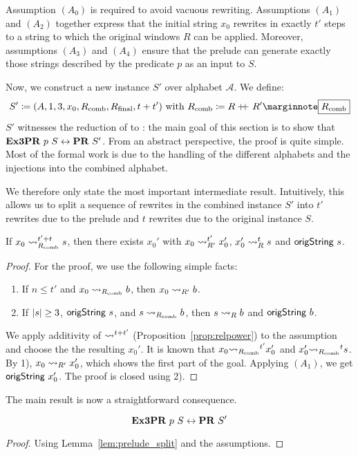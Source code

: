 Assumption $(A_0)$ is required to avoid vacuous rewriting.
Assumptions $(A_1)$ and $(A_2)$ together express that the initial string $x_0$ rewrites in exactly $t'$ steps to a string to which the original windows $R$ can be applied. Moreover, assumptions $(A_3)$ and $(A_4)$ ensure that the prelude can generate exactly those strings described by the predicate $p$ as an input to $S$.

\newcommand{\Rcomb}{\ensuremath{R_{\text{comb}}}}
Now, we construct a new \PR{} instance $S'$ over alphabet $\mathcal{A}$. We define:
\[S' \defeq (A, 1, 3, x_0, \Rcomb, \Rfinal, t + t')~\text{with}~\Rcomb \defeq R \concat R' \mnote{$\Rcomb$}\]
$S'$ witnesses the reduction of \expr{} to \PR{}: the main goal of this section is to show that 
$\textbf{Ex3PR}{}~p~S \leftrightarrow \textbf{PR}{}~S'$. From an abstract perspective, the proof is quite simple. 
Most of the formal work is due to the handling of the different alphabets and the injections into the combined alphabet.

We therefore only state the most important intermediate result. Intuitively, this allows us to split a sequence of rewrites in the combined instance $S'$ into $t'$ rewrites due to the prelude and $t$ rewrites due to the original instance $S$. 
\begin{lemma}\label{lem:prelude_split}
  If $x_0 \strent{\Rcomb}^{t' + t} s$, then there exists $x_0'$ with $x_0 \rightsquigarrow_{R'}^{t'} x_0'$, $x_0' \rightsquigarrow_{R}^t s$ and $\textsf{origString}~s$. 
\end{lemma}
\begin{proof}
  For the proof, we use the following simple facts:
  \begin{enumerate}[1)]
    \item If $n \le t'$ and $x_0 \strent{\Rcomb} b$, then $x_0 \rightsquigarrow_{R'} b$. 
    \item If $|s| \ge 3$, $\textsf{origString}~s$, and $s \strent{\Rcomb} b$, then $s \rightsquigarrow_{R} b$ and $\textsf{origString}~b$. 
  \end{enumerate}
  We apply additivity of $\rightsquigarrow_{}^{t+t'}$ (Proposition~\ref{prop:relpower}) to the assumption and choose the the resulting $x_0'$. 
  It is known that $x_0 {\strent{\Rcomb}}^{t'} x_0'$ and $x_0' {\strent{\Rcomb}}^t s$. 
  By 1), $x_0 \rightsquigarrow_{R'} x_0'$, which shows the first part of the goal. 
  Applying $(A_1)$, we get $\textsf{origString}~x_0'$. The proof is closed using 2).
\end{proof}

The main result is now a straightforward consequence.
\begin{theorem}\label{thm:expr_to_pr}
  \[\textbf{Ex3PR}{}~p~S \leftrightarrow \textbf{PR}{}~S' \]
\end{theorem}
\begin{proof}
  Using Lemma~\ref{lem:prelude_split} and the assumptions.
\end{proof}

